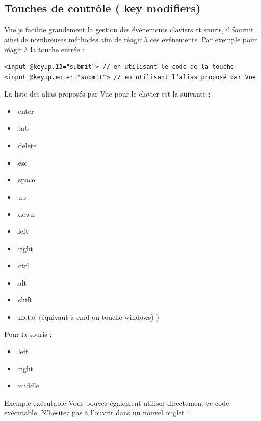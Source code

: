 \documentclass{article}
\begin{document}
\subsection{Touches de contrôle ( {\color{monOrange}key modifiers})}
{\color{monOrange}Vue.js} facilite grandement la gestion des événements claviers et souris, il fournit ainsi de nombreuses méthodes afin de réagir à ces événements. Par exemple pour réagir à la touche entrée :
\begin{verbatim}
<input @keyup.13="submit"> // en utilisant le code de la touche
<input @keyup.enter="submit"> // en utilisant l’alias proposé par Vue
\end{verbatim}
La liste des alias proposés par Vue pour le clavier est la suivante :
\begin{itemize}
\item {\color{blue} .enter}
\item {\color{blue} .tab}
\item {\color{blue} .delete}
\item {\color{blue} .esc}
\item {\color{blue} .space}
\item {\color{blue} .up}
\item {\color{blue} .down}
\item {\color{blue} .left}
\item {\color{blue} .right}
\item {\color{blue} .ctrl}
\item {\color{blue} .alt}
\item {\color{blue} .shift}
\item {\color{blue} .meta}( (équivaut à cmd ou touche windows) )
\end{itemize}
Pour la souris :
\begin{itemize}
\item {\color{blue} .left}
\item {\color{blue}.right}
\item {\color{blue}.middle}
\end{itemize}
Exemple exécutable
Vous pouvez également utiliser directement ce code exécutable. N'hésitez pas à l'ouvrir dans un nouvel onglet :
\end{document}
